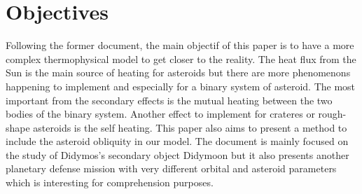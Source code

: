 \section{Objectives}
\label{sec:3}

Following the former document, the main objectif of this paper is to have a more complex thermophysical model to get closer to the reality. The heat flux from the Sun is the main source of heating for asteroids but there are more phenomenons happening to implement and especially for a binary system of asteroid. The most important from the secondary effects is the mutual heating between the two bodies of the binary system. Another effect to implement for crateres or rough-shape asteroids is the self heating. This paper also aims to present a method to include the asteroid obliquity in our model. The document is mainly focused on the study of Didymos's secondary object Didymoon but it also presents another planetary defense mission with very different orbital and asteroid parameters which is interesting for comprehension purposes.
